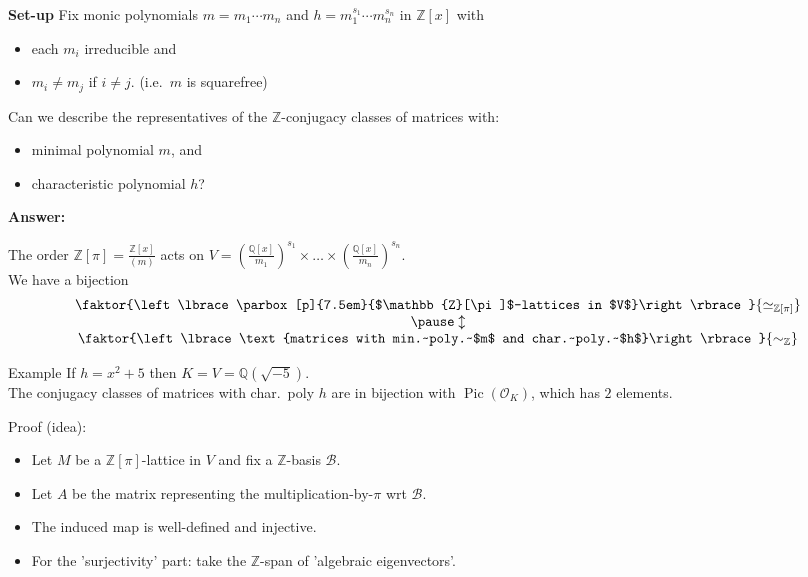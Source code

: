 \documentclass[aspectratio=169,handout,usenames,dvipsnames]{beamer}
\def\Q{\mathbb{Q}}
\def\Z{\mathbb{Z}}
\DeclareMathOperator{\Pic}{Pic}
\newcommand{\cO}{{\mathcal O}}
\newcommand{\set}[1]{\left\lbrace#1\right\rbrace }
\begin{document}
\begin{frame}{}
   {\bf Set-up} 
   Fix monic polynomials $m=m_1\cdots m_n$ and $h=m_1^{s_1}\cdots m_n^{s_n}$ in $\Z[x]$ with 
   \begin{itemize}
      \item each $m_i$ irreducible and 
      \item $m_i\neq m_j$ if $i\neq j$. (i.e.~$m$ is squarefree)
   \end{itemize}
   
   Can we describe the representatives of the $\Z$-conjugacy classes of matrices with:
   \begin{itemize}
      \item minimal polynomial $m$, and
      \item characteristic polynomial $h$?
   \end{itemize}
   \pause
   {\bf Answer:}
   \begin{theorem}
      The order $\Z[\pi]=\frac{\Z[x]}{(m)}$ acts on $V=\left(\frac{\Q[x]}{m_1}\right)^{s_1}
      \times \ldots \times 
      \left(\frac{\Q[x]}{m_n}\right)^{s_n}$.\\
      We have a bijection
      \[ \begin{array}{cc}
         \faktor{\set{\parbox[p]{7.5em}{$\Z[\pi]$-lattices in $V$}}}
         {\simeq_{\Z[\pi]}}\\
         \pause \updownarrow\\
         \faktor{\set{\text{matrices with min.~poly.~$m$ and char.~poly.~$h$}}}{\sim_\Z}\\
      \end{array} \]
   \end{theorem}
\end{frame}

\begin{frame}
   \begin{exampleblock}{Example}
      If $h=x^2+5$ then $K=V=\Q(\sqrt{-5})$.\\ 
      The conjugacy classes of matrices with char.~poly $h$ are in bijection with $\Pic(\cO_K)$, which has $2$ elements.
   \end{exampleblock}

   \pause
   Proof (idea):\\
   \begin{itemize}
      \pause
      \item Let $M$ be a $\Z[\pi]$-lattice in $V$ and fix a $\Z$-basis $\mathcal{B}$.
      \pause
      \item Let $A$ be the matrix representing the multiplication-by-$\pi$ wrt $\mathcal{B}$.
      \pause
      \item The induced map is well-defined and injective.
      \pause
      \item For the 'surjectivity' part: take the $\Z$-span of 'algebraic eigenvectors'.
   \end{itemize}
\end{frame}
\end{document}
